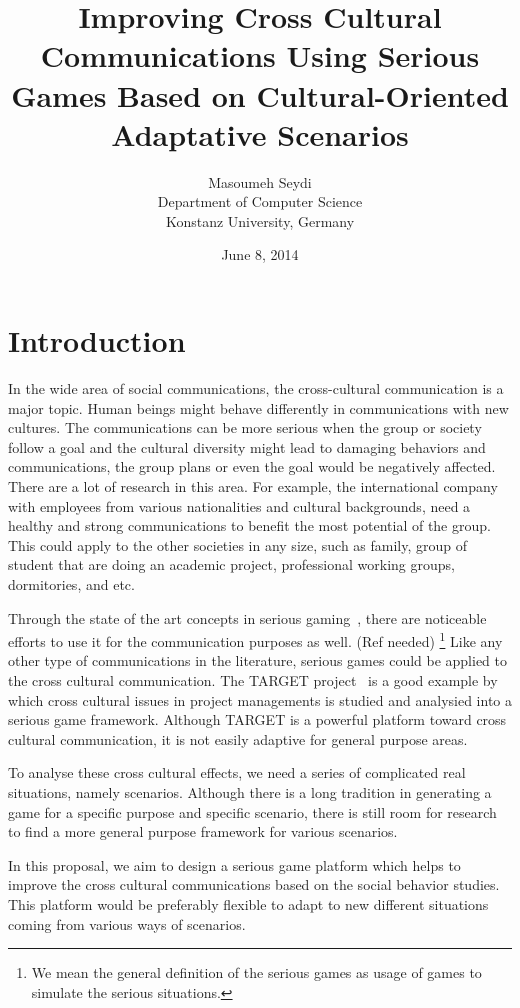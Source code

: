 \documentclass[conference]{IEEEtran}
\title{Improving Cross Cultural Communications Using Serious Games
Based on Cultural-Oriented Adaptative Scenarios}
\date{June 8, 2014}
\author{Masoumeh Seydi\\ Department of Computer Science\\
       Konstanz University, Germany}
\begin{document}
\maketitle

\section{Introduction}

In the wide area of social communications, the cross-cultural communication is 
a major topic. Human beings might behave differently in communications with
new cultures. The communications can be more serious when the group or society 
follow a goal and the cultural diversity might lead to damaging behaviors and communications,
the group plans or even the goal would be negatively affected.
There are a lot of research in this area.
For example, the international company with employees from various nationalities
and cultural backgrounds, need a healthy and strong communications to benefit the most potential
of the group.
This could apply to the other societies in any size, such as family, group of student that
are doing an academic project, professional working groups, dormitories, and etc. 

Through the state of the art concepts in serious gaming~\cite{sergame1,sergame2}, 
there are noticeable efforts to use it for the communication purposes as well. (Ref needed)
\footnote{We mean the general definition of the serious games as 
usage of games to simulate the serious situations.}
Like any other type of communications in the literature, serious games could be applied 
to the cross cultural communication.
The TARGET project~\cite{project-manage} is a good example by which cross cultural issues in 
project managements is studied and analysied into a serious game framework.
Although TARGET is a powerful platform toward cross cultural communication,
it is not easily adaptive for general purpose areas.

To analyse these cross cultural effects, we need
a series of complicated real situations, namely scenarios.
Although there is a long tradition in generating a game
for a specific purpose and specific scenario, 
there is still room for research 
to find a more general purpose framework for various scenarios.

In this proposal, we aim to design a serious game platform which helps to 
improve the cross cultural communications based on the social behavior studies.
This platform would be preferably flexible to adapt to new different situations coming
from various ways of scenarios. 
\end{document}
